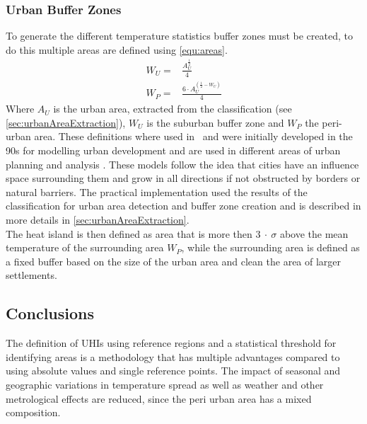 \documentclass[12pt,a4paper, english,twoside]{scrartcl}
\begin{document}
    \subsubsection{Urban Buffer Zones}\label{sec:urbanBufferzone}
      To generate the different temperature statistics buffer zones must be created, to do this multiple areas are defined using \cref{equ:areas}.
      \begin{equation}\label{equ:areas}
        \begin{split}
          W_U = & \frac{A_U^{\frac{1}{2}}}{4} \\
          W_P = & \frac{6\cdot A_U^{(\frac{1}{2}-W_U)}}{4}
        \end{split}
      \end{equation}
      Where $A_U$ is the urban area, extracted from the classification (see \cref{sec:urbanAreaExtraction}), $W_U$ is the suburban buffer zone and $W_P$ the peri-urban area.
      These definitions where used in~\cite{Sobrino2020} and were initially developed in the 90s for modelling urban development and are used in different areas of urban planning and analysis \autocite[see]{AlkanBala2014}.
      These models follow the idea that cities have an influence space surrounding them and grow in all directions if not obstructed by borders or natural barriers. 
      The practical implementation used the results of the classification for urban area detection and buffer zone creation and is described in more details in \cref{sec:urbanAreaExtraction}. \\
      The heat island is then defined as area that is more then $3~\cdot~\sigma$ above the mean temperature of the surrounding area $W_P$, while the surrounding area is defined as a fixed buffer based on the size of the urban area and clean the area of larger settlements. 
    \subsection{Conclusions}
    The definition of \glspl{UHI} using reference regions and a statistical threshold for identifying areas is a methodology that has multiple advantages compared to using absolute values and single reference points. 
    The impact of seasonal and geographic variations in temperature spread as well as weather and other metrological effects are reduced, since the peri urban area has a mixed composition. 

\newpage
\end{document}
